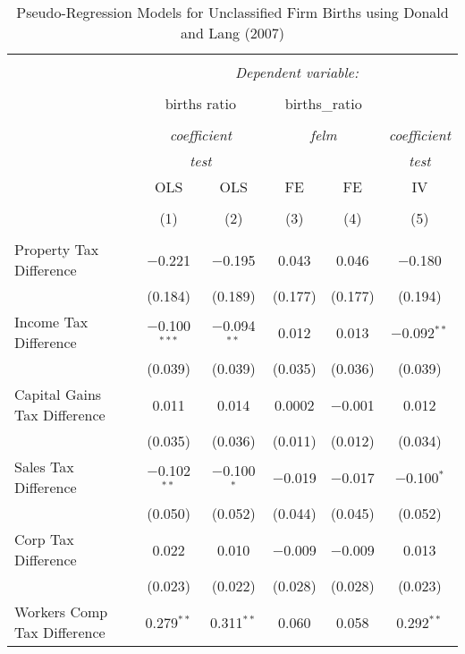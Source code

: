 
\begin{table}[!htbp] \centering 
  \caption{Pseudo-Regression Models for  Unclassified Firm Births using Donald and Lang (2007)} 
  \label{} 
\begin{tabular}{@{\extracolsep{5pt}}lccccc} 
\\[-1.8ex]\hline 
\hline \\[-1.8ex] 
 & \multicolumn{5}{c}{\textit{Dependent variable:}} \\ 
\cline{2-6} 
\\[-1.8ex] & \multicolumn{2}{c}{births ratio} & \multicolumn{2}{c}{births\_ratio} &   \\ 
\\[-1.8ex] & \multicolumn{2}{c}{\textit{coefficient}} & \multicolumn{2}{c}{\textit{felm}} & \textit{coefficient} \\ 
 & \multicolumn{2}{c}{\textit{test}} & \multicolumn{2}{c}{\textit{}} & \textit{test} \\ 
 & OLS & OLS & FE & FE & IV \\ 
\\[-1.8ex] & (1) & (2) & (3) & (4) & (5)\\ 
\hline \\[-1.8ex] 
 Property Tax Difference & $-$0.221 & $-$0.195 & 0.043 & 0.046 & $-$0.180 \\ 
  & (0.184) & (0.189) & (0.177) & (0.177) & (0.194) \\ 
  Income Tax Difference & $-$0.100$^{***}$ & $-$0.094$^{**}$ & 0.012 & 0.013 & $-$0.092$^{**}$ \\ 
  & (0.039) & (0.039) & (0.035) & (0.036) & (0.039) \\ 
  Capital Gains Tax Difference & 0.011 & 0.014 & 0.0002 & $-$0.001 & 0.012 \\ 
  & (0.035) & (0.036) & (0.011) & (0.012) & (0.034) \\ 
  Sales Tax Difference & $-$0.102$^{**}$ & $-$0.100$^{*}$ & $-$0.019 & $-$0.017 & $-$0.100$^{*}$ \\ 
  & (0.050) & (0.052) & (0.044) & (0.045) & (0.052) \\ 
  Corp Tax Difference & 0.022 & 0.010 & $-$0.009 & $-$0.009 & 0.013 \\ 
  & (0.023) & (0.022) & (0.028) & (0.028) & (0.023) \\ 
  Workers Comp Tax Difference & 0.279$^{**}$ & 0.311$^{**}$ & 0.060 & 0.058 & 0.292$^{**}$ \\ 

\end{tabular}
\end{table}
